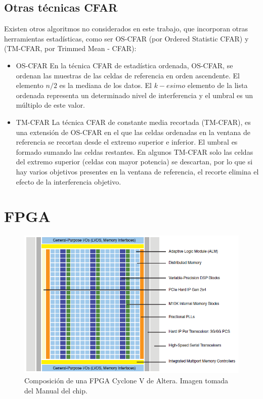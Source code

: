 \subsection{Otras técnicas CFAR}
Existen otros algoritmos no considerados en este trabajo, que incorporan otras herramientas estadísticas, como ser OS-CFAR (por Ordered Statistic CFAR) y (TM-CFAR, por Trimmed Mean - CFAR):
\begin{itemize}
\item OS-CFAR
En la técnica CFAR de estadística ordenada, OS-CFAR, se ordenan las muestras de las celdas de referencia en orden ascendente. El elemento \(n/2\) es la mediana de los datos. El \(k-esimo\) elemento de la lista ordenada representa un determinado nivel de interferencia y el umbral es un múltiplo de este valor.
\item TM-CFAR
La técnica CFAR de constante media recortada (TM-CFAR), es una extensión de OS-CFAR en el que las celdas ordenadas en la ventana de referencia se recortan desde el extremo superior e inferior. El umbral es formado sumando las celdas restantes. En algunos TM-CFAR solo las celdas del extremo superior (celdas con mayor potencia) se descartan, por lo que si hay varios objetivos presentes en la ventana de referencia, el recorte elimina el efecto de la interferencia
objetivo.

\end{itemize}


\section{FPGA}

\begin{figure}
\centering
\includegraphics[scale=0.5]{./Figures/22-0.png}
\caption{Composición de una FPGA Cyclone V de Altera. Imagen tomada del Manual del chip.}
\label{fig:fpga_por_dentro}
\end{figure}

